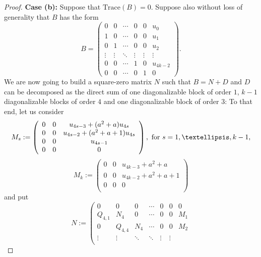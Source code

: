 \documentclass[10pt,a4paper]{amsart}
\begin{document}
\begin{proof}
{\bf Case (b):} Suppose that $\text{Trace}(B)= 0$. Suppose also without loss of generality that $B$ has the form
$$
B=\left(\begin{array}{cccccc}
                                                                          0 & 0 & \cdots & 0 & 0 &u_0\\
                                                                          1 & 0 & \cdots & 0 & 0 &u_1\\
                                                                          0 & 1 & \cdots & 0 & 0 &u_2\\
                                                                          \vdots & \vdots & \ddots & \vdots & \vdots &\vdots\\
                                                                          0 & 0 & \cdots & 1 & 0 &u_{4k-2}\\
                                                                          0 & 0 & \cdots & 0 & 1 &0
                                                                        \end{array}\right).$$
We are now going to build a square-zero matrix $N$ such that $B=N+D$ and $D$ can be decomposed as the direct sum of one diagonalizable block of order $1$, $k-1$ diagonalizable blocks of order $4$ and one diagonalizable block of order $3$: To that end, let us consider
$$M_s:=\left(
   \begin{array}{ccc}
     0 & 0 &u_{4s-3}+(a^2+a) u_{4s}\\
     0 & 0 &u_{4s-2}+(a^2+a+1) u_{4s}\\
     0 & 0 &u_{4s-1}\\
     0 & 0 &0\\
   \end{array}
 \right),\hbox{ for $s=1,\dots, k-1$,}
$$
$$M_{k}:=\left(
   \begin{array}{ccc}
      0& 0 &u_{4k-3}+a^2+a\\
      0 & 0 &u_{4k-2}+a^2+a+1\\
      0 & 0 &0\\
   \end{array}
 \right)$$
and put
$$N:=\left(
      \begin{array}{cccccccc}
        0 & 0 & 0 & \cdots & 0 &0 &  0 \\
        Q_{4,1} & N_4 & 0 & \cdots &0 & 0  & M_1 \\
        0 & Q_{4,4} & N_4 & \cdots &0 & 0  & M_2 \\
        \vdots & \vdots & \ddots & \ddots  & \vdots & \vdots \\

\end{array}$$
\end{proof}
\end{document}
